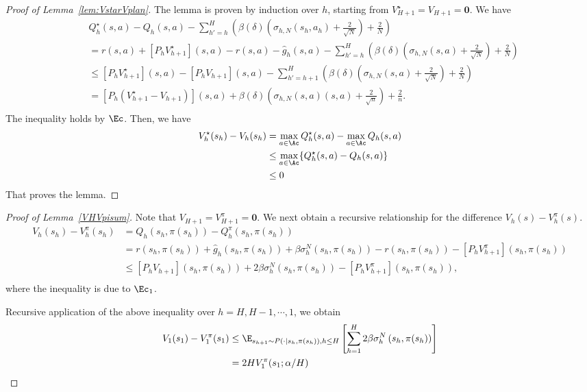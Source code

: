 \begin{proof}[Proof of Lemma~\ref{lem:VstarVplan}]

The lemma is proven by induction over $h$, starting from $V^{\star}_{H+1} = V_{H+1}=\bm{0}$. We have
\begin{align*}
    &Q^{\star}_h(s,a) - Q_{h}(s,a) - \sum_{h'=h}^H\left(\beta(\delta)(\sigma_{h,N}(s_h,a_h)+\frac{2}{\sqrt{N}})+\frac{2}{N}\right)\\
    &= r(s,a)+ [P_hV^{\star}_{h+1}](s,a)- r(s,a) - \hat{g}_{h}(s,a)- \sum_{h'=h}^H\left(\beta(\delta)(\sigma_{h,N}(s,a)+\frac{2}{\sqrt{N}})+\frac{2}{N}\right)\\
    &\le [P_hV^{\star}_{h+1}](s,a) -[P_hV_{h+1}](s,a)- \sum_{h'=h+1}^H\left(\beta(\delta)(\sigma_{h,N}(s,a)+\frac{2}{\sqrt{N}})+\frac{2}{N}\right)\\
    &=[P_h(V^{\star}_{h+1}-V_{h+1})](s,a)+\beta(\delta)(\sigma_{h,N}(s,a)(s,a)+\frac{2}{\sqrt{n}})+\frac{2}{n}.\\
\end{align*}
The inequality holds by $\Ec$.
Then, we have
\begin{align*}
    V^{\star}_h(s_h) - V_h(s_h) &=
    \max_{a\in\Ac} Q^{\star}_h(s,a) - \max_{a\in\Ac}Q_{h}(s,a)\\
    &\le \max_{a\in\Ac} \{Q^{\star}_h(s,a) - Q_{h}(s,a)\}\\
    &\le 0
\end{align*}
That proves the lemma. 

\end{proof}




\begin{proof}[Proof of Lemma~\ref{VHVpisum}]
Note that $V_{H+1}=V^{\pi}_{H+1}=\bm{0}$. We next obtain a recursive relationship for the difference $V_h(s)-V^{\pi}_h(s)$. 
\begin{align*}
    V_h(s_h)-V^{\pi}_h(s_h) &= Q_h\left(s_h, \pi(s_h)\right) -  Q^{\pi}_h\left(s_h, \pi(s_h)\right) \\
    &=r\left(s_h, \pi(s_h)\right) + \hat{g}_h\left(s_h, \pi(s_h)\right) + \beta\sigma^N_h\left(s_h, \pi(s_h)\right) - r\left(s_h, \pi(s_h)\right) - [P_hV^{\pi}_{h+1}]\left(s_h, \pi(s_h)\right)\\
    &\le [P_hV_{h+1}]\left(s_h, \pi(s_h)\right) +2\beta\sigma^N_h\left(s_h, \pi(s_h)\right) - [P_hV^{\pi}_{h+1}]\left(s_h, \pi(s_h)\right),\\
\end{align*}
where the inequality is due to $\Ec_1$. 

Recursive application of the above inequality over $h=H, H-1, \cdots, 1$, we obtain
\begin{align*}
    V_1(s_1) - V_1^{\pi}(s_1)& \le \E_{s_{h+1}\sim P(\cdot|s_h,\pi(s_h)), h \le H}\left[\sum_{h=1}^H2\beta\sigma^N_h\left(s_h, \pi(s_h)\right)\right]\\
    &=2HV_1^{\pi}(s_1; \alpha/H )
\end{align*}


\end{proof}


